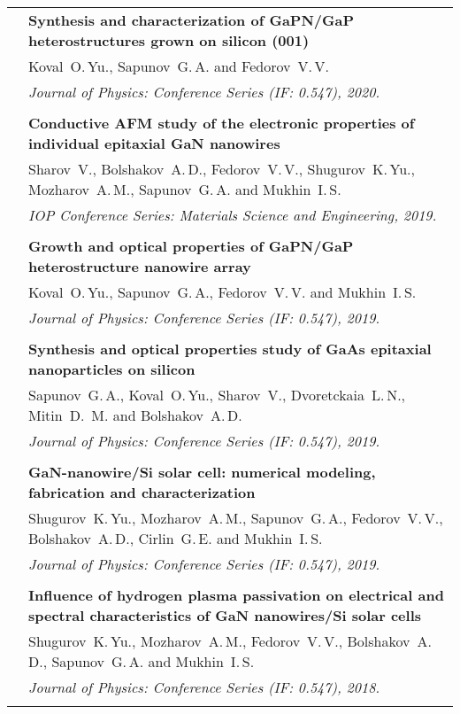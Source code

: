 \documentclass[letterpaper, 11pt]{article}
\begin{document}
\begin{longtable}{p{1.3in}p{4.8in}}
        & \textbf{Synthesis and characterization of GaPN/GaP heterostructures
        grown on silicon (001)} \\
        & Koval~O.\,Yu., Sapunov~G.\,A. and Fedorov~V.\,V. \\
        & \textit{Journal of Physics: Conference Series (IF: 0.547), 2020.}\\
		& \\
		
        & \textbf{Conductive AFM study of the electronic properties of
        individual epitaxial GaN nanowires} \\
        & Sharov~V., Bolshakov~A.\,D., Fedorov~V.\,V., Shugurov~K.\,Yu.,
        Mozharov~A.\,M., Sapunov~G.\,A. and Mukhin~I.\,S. \\
		& \textit{IOP Conference Series: Materials Science and Engineering, 2019.}\\
		& \\
		
        & \textbf{Growth and optical properties of GaPN/GaP heterostructure
        nanowire array} \\
        & Koval~O.\,Yu., Sapunov~G.\,A., Fedorov~V.\,V. and Mukhin~I.\,S. \\
		& \textit{Journal of Physics: Conference Series (IF: 0.547), 2019.}\\
		& \\
		
        & \textbf{Synthesis and optical properties study of GaAs epitaxial
        nanoparticles on silicon} \\
        & Sapunov~G.\,A., Koval~O.\,Yu., Sharov~V., Dvoretckaia~L.\,N.,
        Mitin~D.\, M. and Bolshakov~A.\,D. \\
		& \textit{Journal of Physics: Conference Series (IF: 0.547), 2019.}\\
		& \\
		
        & \textbf{GaN-nanowire/Si solar cell: numerical modeling, fabrication
        and characterization} \\
        & Shugurov~K.\,Yu., Mozharov~A.\,M., Sapunov~G.\,A., Fedorov~V.\,V.,
        Bolshakov~A.\,D., Cirlin~G.\,E. and Mukhin~I.\,S. \\
		& \textit{Journal of Physics: Conference Series (IF: 0.547), 2019.}\\
		& \\
		
        & \textbf{Influence of hydrogen plasma passivation on electrical and
        spectral characteristics of GaN nanowires/Si solar cells} \\
        & Shugurov~K.\,Yu., Mozharov~A.\,M., Fedorov~V.\,V., Bolshakov~A.\,D.,
        Sapunov~G.\,A. and Mukhin~I.\,S. \\
		& \textit{Journal of Physics: Conference Series (IF: 0.547), 2018.}\\
		& \\
		

\end{longtable}
\end{document}
